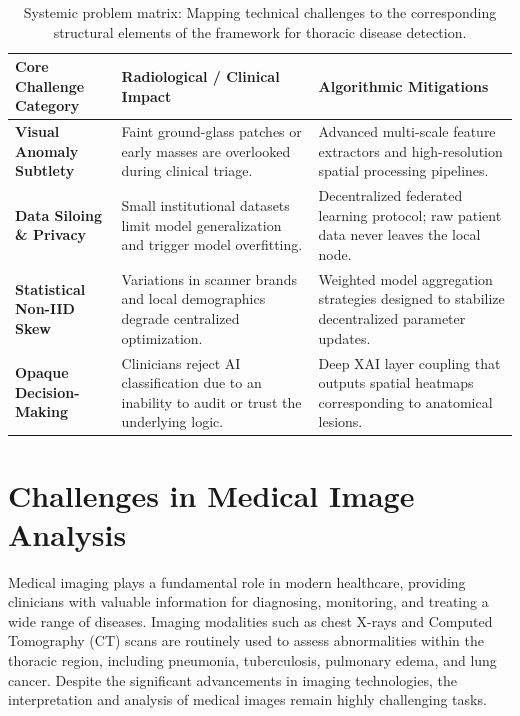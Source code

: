 \begin{table}[htbp]
	\centering
	\caption{Systemic problem matrix: Mapping technical challenges to the corresponding structural elements of the framework for thoracic disease detection.}
	\label{tab:problem_framework_matrix}
	\small
	\begin{tabularx}{\textwidth}{lXX}
		\toprule
		\textbf{Core Challenge Category} & \textbf{Radiological / Clinical Impact} & \textbf{Algorithmic Mitigations} \\
		\midrule
		\textbf{Visual Anomaly Subtlety} & Faint ground-glass patches or early masses are overlooked during clinical triage. & Advanced multi-scale feature extractors and high-resolution spatial processing pipelines. \\
		\addlinespace
		\textbf{Data Siloing \& Privacy} & Small institutional datasets limit model generalization and trigger model overfitting. & Decentralized federated learning protocol; raw patient data never leaves the local node. \\
		\addlinespace
		\textbf{Statistical Non-IID Skew} & Variations in scanner brands and local demographics degrade centralized optimization. & Weighted model aggregation strategies designed to stabilize decentralized parameter updates. \\
		\addlinespace
		\textbf{Opaque Decision-Making} & Clinicians reject AI classification due to an inability to audit or trust the underlying logic. & Deep XAI layer coupling that outputs spatial heatmaps corresponding to anatomical lesions. \\
		\bottomrule
	\end{tabularx}
\end{table}


\section{Challenges in Medical Image Analysis}

Medical imaging plays a fundamental role in modern healthcare, providing clinicians with valuable information for diagnosing, monitoring, and treating a wide range of diseases. Imaging modalities such as chest X-rays and Computed Tomography (CT) scans are routinely used to assess abnormalities within the thoracic region, including pneumonia, tuberculosis, pulmonary edema, and lung cancer. Despite the significant advancements in imaging technologies, the interpretation and analysis of medical images remain highly challenging tasks.

